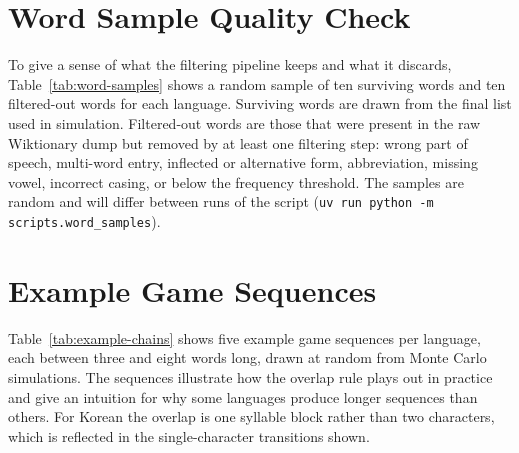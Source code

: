 \appendix

\section{Word Sample Quality Check}
\label{app:word-samples}

To give a sense of what the filtering pipeline keeps and what it discards, Table~\ref{tab:word-samples} shows a random sample of ten surviving words and ten filtered-out words for each language.
Surviving words are drawn from the final list used in simulation.
Filtered-out words are those that were present in the raw Wiktionary dump but removed by at least one filtering step: wrong part of speech, multi-word entry, inflected or alternative form, abbreviation, missing vowel, incorrect casing, or below the frequency threshold.
The samples are random and will differ between runs of the script (\texttt{uv run python -m scripts.word\_samples}).




\section{Example Game Sequences}
\label{app:example-chains}

Table~\ref{tab:example-chains} shows five example game sequences per language, each between three and eight words long, drawn at random from Monte Carlo simulations.
The sequences illustrate how the overlap rule plays out in practice and give an intuition for why some languages produce longer sequences than others.
For Korean the overlap is one syllable block rather than two characters, which is reflected in the single-character transitions shown.


